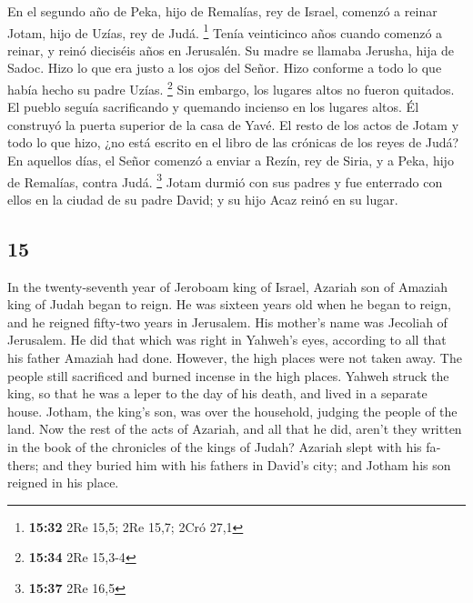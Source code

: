 \begin{paracol}{2}
 En el segundo año de Peka, hijo de Remalías, rey de
Israel, comenzó a reinar Jotam, hijo de Uzías, rey de Judá. \footnote{\textbf{15:32}
  2Re 15,5; 2Re 15,7; 2Cró 27,1}  Tenía veinticinco años
cuando comenzó a reinar, y reinó dieciséis años en Jerusalén. Su madre
se llamaba Jerusha, hija de Sadoc.  Hizo lo que era justo
a los ojos del Señor. Hizo conforme a todo lo que había hecho su padre
Uzías. \footnote{\textbf{15:34} 2Re 15,3-4}  Sin embargo,
los lugares altos no fueron quitados. El pueblo seguía sacrificando y
quemando incienso en los lugares altos. Él construyó la puerta superior
de la casa de Yavé.  El resto de los actos de Jotam y
todo lo que hizo, ¿no está escrito en el libro de las crónicas de los
reyes de Judá?  En aquellos días, el Señor comenzó a
enviar a Rezín, rey de Siria, y a Peka, hijo de Remalías, contra Judá.
\footnote{\textbf{15:37} 2Re 16,5}  Jotam durmió con sus
padres y fue enterrado con ellos en la ciudad de su padre David; y su
hijo Acaz reinó en su lugar.

\switchcolumn
\begin{otherlanguage}{english}

\hypertarget{section-29}{%
\section{15}\label{section-29}}

 In the twenty-seventh year of Jeroboam king of Israel,
Azariah son of Amaziah king of Judah began to reign.  He
was sixteen years old when he began to reign, and he reigned fifty-two
years in Jerusalem. His mother's name was Jecoliah of Jerusalem.
 He did that which was right in Yahweh's eyes, according
to all that his father Amaziah had done.  However, the
high places were not taken away. The people still sacrificed and burned
incense in the high places.  Yahweh struck the king, so
that he was a leper to the day of his death, and lived in a separate
house. Jotham, the king's son, was over the household, judging the
people of the land.  Now the rest of the acts of Azariah,
and all that he did, aren't they written in the book of the chronicles
of the kings of Judah?  Azariah slept with his fathers;
and they buried him with his fathers in David's city; and Jotham his son
reigned in his place.


\end{otherlanguage}
\end{paracol}
